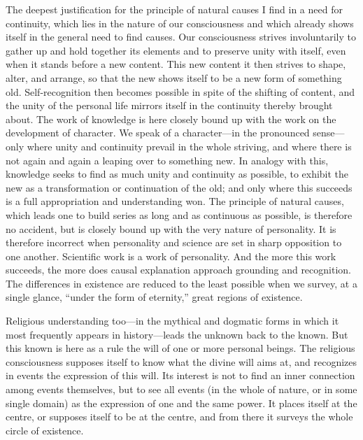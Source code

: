 \documentclass[12pt,a4paper]{book}
\newcommand{\opage}[1]{\marginnote{\footnotesize\textit{[#1]}}}
\begin{document}
The deepest justification for the principle of natural causes I find in
a need for continuity, which lies in the nature of our consciousness and
which already shows itself in the general need to find causes. Our
consciousness strives involuntarily to gather up and hold together its
elements and to preserve unity with itself, even when it stands before a
new content. This new content it then strives to shape, alter, and
arrange, so that the new shows itself to be a new form of something old.
Self-recognition then becomes possible in spite of the shifting of
content, and the unity of the personal life mirrors itself in the
continuity thereby brought about. The work of knowledge is here closely
bound up with the work on the development of character. We speak of a
character---in the pronounced sense---only where unity and continuity
prevail in the whole striving, and where there is not again and again a
leaping over to something new. In analogy with this, knowledge seeks to
find as much unity and continuity as possible, to exhibit the new as a
transformation or continuation of the old; and only where this succeeds
is a full appropriation and understanding won. The principle of natural
causes, which leads one to build series as long and as continuous as
possible, is therefore no accident, but is closely bound up with the
very nature of personality. It is therefore incorrect when personality
and science are set in sharp opposition to one another. Scientific work
is a work of personality. And 
\opage{20}the more this work succeeds, the more does
causal explanation approach grounding and recognition. The differences
in existence are reduced to the least possible when we survey, at a
single glance, ``under the form of eternity,'' great regions of
existence.

Religious understanding too---in the mythical and dogmatic forms in
which it most frequently appears in history---leads the unknown back to
the known. But this known is here as a rule the will of one or more
personal beings. The religious consciousness supposes itself to know
what the divine will aims at, and recognizes in events the expression of
this will. Its interest is not to find an inner connection among events
themselves, but to see all events (in the whole of nature, or in some
single domain) as the expression of one and the same power. It places
itself at the centre, or supposes itself to be at the centre, and from
there it surveys the whole circle of existence.
\end{document}

